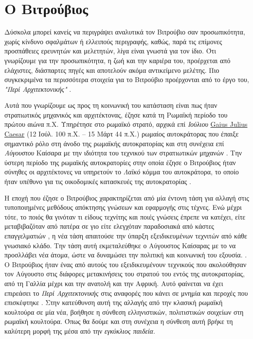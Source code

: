 
\section{Ο Βιτρούβιος}

Δύσκολα μπορεί κανείς να περιγράψει αναλυτικά τον Βιτρούβιο
σαν προσωπικότητα, χωρίς κίνδυνο σφαλμάτων ή ελλειπούς περιγραφής, καθώς, παρά τις επίμονες προσπάθειες ερευνητών και μελετητών, λίγα είναι γνωστά για τον ίδιο. Ότι γνωρίζουμε για την προσωπικότητα, η ζωή και την καριέρα του, προέρχεται από ελάχιστες, διάσπαρτες πηγές και αποτελούν ακόμα αντικείμενο μελέτης. Πιο συγκεκριμένα τα περισσότερα στοιχεία για το Βιτρούβιο προέρχονται από το έργο του, \emph{"Περί Αρχιτεκτονικής"} \cite{vitruvius-lefas,baldwin-1990,masterson_status_2004}.

Αυτά που γνωρίζουμε ως προς τη κοινωνική του κατάσταση είναι πως ήταν στρατιωτικός μηχανικός και αρχιτέκτονας, έζησε κατά τη Ρωμαϊκή περίοδο του πρώτου αιώνα π.Χ. Υπηρέτησε στο ρωμαϊκό  στρατό, αρχικά επί \emph{Ιούλιου} \sidenote%
    {\href{https://en.wikipedia.org/wiki/Julius_Caesar}{Gaius
    Julius Caesar} (12 Ιούλ. 100 π.Χ. – 15 Μάρτ 44 π.Χ.) ρωμαίος
    αυτοκράτορας που έπαιξε σημαντικό ρόλο στη άνοδο της ρωμαϊκής
    αυτοκρατορίας}
και στη συνέχεια επί \emph{Αύγουστου} Καίσαρα  με την ιδιότητα του τεχνικού των στρατιωτικών μηχανών \cite{vitruvius-lefas,enwiki:vitruvius}. Την ύστερη περίοδο της ρωμαϊκής αυτοκρατορίες στην οποία έζησε ο Βιτρούβιος ήταν σύνηθες οι αρχιτέκτονες να υπηρετούν το \emph{Λαϊκό} κόμμα του αυτοκράτορα, το οποίο ήταν υπέθυνο για τις οικοδομικές κατασκευές της αυτοκρατορίας \cite[σ. 13]{vitruvius-lefas}.

Η εποχή που έζησε ο Βιτρούβιος χαρακτηρίζεται από μία έντονη τάση για αλλαγή στις τυποποιημένες μεθόδους απόκτησης γνώσεων και εφαρμογής στις τέχνες. Ενώ μέχρι τότε, το ποιός θα γινόταν τι είδους τεχνίτης και ποιές γνώσεις έπρεπε να κατέχει, είτε μεταβιβαζόταν από πατέρα σε γιο είτε ελεγχόταν παραδοσιακά από κάστες επαγγελματιών , η νέα τάση απαιτούσε την ύπαρξη εξειδικευμένων τεχνιτών από κάθε γνωσιακό κλάδο. Την τάση αυτή εκμεταλεύθηκε ο Αύγουστος Καίσαρας με το να προσλλάβει νέα άτομα, ώστε να δυναμώσει την πολιτική και κοινωνική του εξουσία. \cite{masterson_status_2004,brown-vitruvius}. Ο Βιτρούβιος ήταν ένας από αυτούς του εξειδικευμένουν τεχνικούς που ακολούθησαν τον Αύγουστο στις διάφορες μετακινήσεις του στρατού του εντός της αυτοκρατορίας, από τη Γαλλία μέχρι και την ανατολή και την Αφρική. Αυτό φαίνεται να έχει επιρεάσει το \emph{Περί Αρχιτεκτονικής} στις αναφορές που κάνει σε μνημία και περοχές που επισκέφτηκε \cite[σ. 13]{vitruvius-lefas}. Στην κατεύθυνση αυτή της αλλαγής από την κλασική ρωμαϊκή κουλτούρα σε μία νέα, βοήθησε η σύνθεση ελληνιστικών, πολιτιστικών σοιχείων στη ρωμαϊκή κουλτούρα. Όπως θα δούμε και στη συνέχεια η σύνθεση αυτή βρήκε τη καλύτερη μορφή της μέσα από την \emph{εγκύκλιος παιδεία}.


